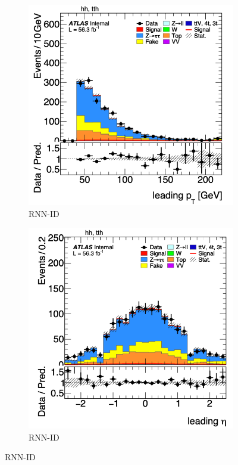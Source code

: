 \begin{figure}[htbp]
    \begin{subfigure}[b]{0.45\textwidth}
        \centering
        \includegraphics[width=\textwidth]{images/leading_pt_rnn.png}
        \caption{RNN-ID}
    \end{subfigure}
    \begin{subfigure}[b]{0.45\textwidth}
        \centering
        \includegraphics[width=\textwidth]{images/leading_eta_rnn.png}
        \caption{RNN-ID}
    \end{subfigure}


\end{figure}
